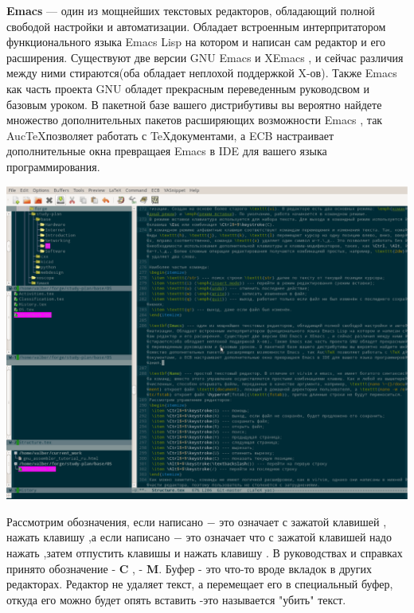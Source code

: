 \textbf{Emacs} --- один из мощнейших текстовых редакторов, обладающий полной свободой настройки и автоматизации. Обладает встроенным интерпритатором функционального языка Emacs Lisp на котором и написан сам редактор и его расширения. Существуют две версии GNU Emacs и XEmacs , и сейчас различия между ними стираются(оба обладает неплохой поддержкой X-ов). Также Emacs как часть проекта GNU обладет прекрасным переведенным руководсвом и базовым уроком. В пакетной базе вашего дистрибутивы вы вероятно найдете множество дополнительных пакетов расширяющих возможности Emacs , так Auc\TeX позволяет работать с \TeX документами, а ECB настраивает дополнительные окна превращаея Emacs в IDE для вашего языка программирования.
\begin{center}
  \includegraphics[scale=0.3]{base/OS/Emacs.eps}
\end{center}

Рассмотрим обозначения, если написано \Ctrl$-$ это означает с зажатой клавишей \Ctrl , нажать клавишу  ,а если написано  \Ctrl$-$  это означает что с зажатой клавишей \Ctrl надо нажать  ,затем отпустить клавишы и нажать клавишу . В руководствах и справках принято обозначение \Ctrl - \textbf{C} , \Alt - \textbf{M}. Буфер - это что-то вроде вкладок в других редакторах. Редактор не удаляет текст, а перемещает его в специальный буфер, откуда его можно будет опять вставить -это называется "убить" текст.

